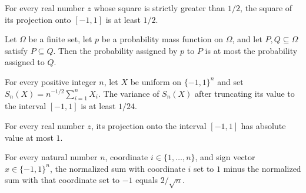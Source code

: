 \begin{theorem}
\label{FABL.truncateUnit_sq_ge_half_of_sq_gt_half}
\leanok
{}
For every real number $z$ whose square is strictly greater than $1/2$, the square of its
projection onto $[-1,1]$ is at least $1/2$.
\end{theorem}

\begin{theorem}
\label{FABL.pmfEventProbability_mono}
\leanok
{}
Let $\Omega$ be a finite set, let $p$ be a probability mass function on $\Omega$, and
let $P,Q\subseteq\Omega$ satisfy $P\subseteq Q$. Then the probability assigned by $p$ to
$P$ is at most the probability assigned to $Q$.
\end{theorem}

\begin{theorem}
\label{FABL.variance_truncatedNormalizedRademacherSum_ge}
\leanok
{}
For every positive integer $n$, let $X$ be uniform on $\{-1,1\}^n$ and set
$S_n(X)=n^{-1/2}\sum_{i=1}^n X_i$. The variance of $S_n(X)$ after truncating its value
to the interval $[-1,1]$ is at least $1/24$.
\end{theorem}

\begin{theorem}
\label{FABL.abs_truncateUnit_le_one}
\leanok
{}
For every real number $z$, its projection onto the interval $[-1,1]$ has absolute value
at most $1$.
\end{theorem}

\begin{theorem}
\label{FABL.normalizedRademacherSum_setCoordinate_sub}
\leanok
{}
For every natural number $n$, coordinate $i\in\{1,\ldots,n\}$, and sign vector
$x\in\{−1,1\}^n$, the normalized sum with coordinate $i$ set to $1$ minus the normalized
sum with that coordinate set to $-1$ equals $2/\sqrt n$.
\end{theorem}

